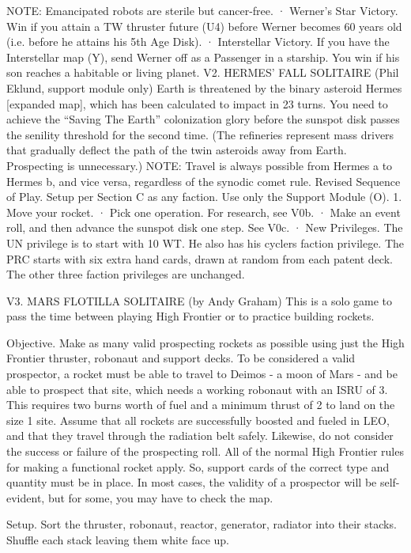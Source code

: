 \documentclass[a4paper]{book}
\begin{document}
NOTE: Emancipated robots are sterile but cancer-free.
·       Werner’s Star Victory. Win if you attain a TW thruster future (U4) before Werner becomes 60 years old (i.e. before he attains his 5th Age Disk).
·       Interstellar Victory. If you have the Interstellar map (Y), send Werner off as a Passenger in a starship. You win if his son reaches a habitable or living planet.
V2. HERMES’ FALL SOLITAIRE (Phil Eklund, support module only)
Earth is threatened by the binary asteroid Hermes [expanded map], which has been calculated to impact in 23 turns. You need to achieve the “Saving The Earth” colonization glory before the sunspot disk passes the senility threshold for the second time. (The refineries represent mass drivers that gradually deflect the path of the twin asteroids away from Earth. Prospecting is unnecessary.)
NOTE: Travel is always possible from Hermes a to Hermes b, and vice versa, regardless of the synodic comet rule.
Revised Sequence of Play. Setup per Section C as any faction. Use only the Support Module (O).
1.   Move your rocket.
·       Pick one operation. For research, see V0b.
·       Make an event roll, and then advance the sunspot disk one step. See V0c.
·       New Privileges. The UN privilege is to start with 10 WT. He also has his cyclers faction privilege. The PRC starts with six extra hand cards, drawn at random from each patent deck. The other three faction privileges are unchanged.
 
V3. MARS FLOTILLA SOLITAIRE (by Andy Graham)
This is a solo game to pass the time between playing High Frontier or to practice building rockets.

Objective. Make as many valid prospecting rockets as possible using just the High Frontier thruster, robonaut and support decks. To be considered a valid prospector, a rocket must be able to travel to Deimos - a moon of Mars - and be able to prospect that site, which needs a working robonaut with an ISRU of 3. This requires two burns worth of fuel and a minimum thrust of 2 to land on the size 1 site. Assume that all rockets are successfully boosted and fueled in LEO, and that they travel through the radiation belt safely. Likewise, do not consider the success or failure of the prospecting roll.
All of the normal High Frontier rules for making a functional rocket apply. So, support cards of the correct type and quantity must be in place. In most cases, the validity of a prospector will be self-evident, but for some, you may have to check the map.

Setup. Sort the thruster, robonaut, reactor, generator, radiator into their stacks. Shuffle each stack leaving them white face up.
\end{document}
